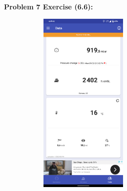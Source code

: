 \documentclass[11pt]{article}
\newenvironment{problem}[1]{\textbf{Problem #1:}}{\newpage}
\begin{document}
\begin{problem}{7 Exercise (6.6)}
\begin{figure}[h!]
\begin{subfigure}{.4\textwidth}
			\end{subfigure}
			\begin{subfigure}{.4\textwidth}
				\centering
				\includegraphics[height = 9cm]{Figures/Prob7/Top.png}
			\end{subfigure}
		\end{figure}
	\end{problem}
\end{document}
